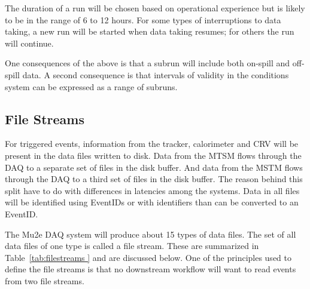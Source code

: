 The duration of a run will be chosen based on operational experience but is likely to be in the range of 6 to 12 hours.  For some types of interruptions to data taking, a new run will be started when data taking resumes; for others the run will continue.

One consequences of the above is that a subrun will include both on-spill and off-spill data. A second consequence is that intervals of validity in the conditions system can be expressed as a range of subruns.

\subsection{File Streams}
\label{ssec:datahandling:filestreams}

For triggered events, information from the tracker, calorimeter and CRV will be present in the data files written to disk.  Data from the MTSM flows through the DAQ to a separate set of files in the disk buffer.  And data from the MSTM flows through the DAQ to a third set of files in the disk buffer.    The reason behind this split have to do with differences in latencies among the systems.  Data in all files will be identified using \art EventIDs or with identifiers than can be converted to an \art EventID.

The  Mu2e DAQ system will produce about 15 types of data files.  The set of all data files of one type is called a file stream.  These are summarized in Table~\ref{tab:filestreams } and are discussed below.  One of the principles used to define the file streams is that no downstream workflow will want to read events from two file streams.

